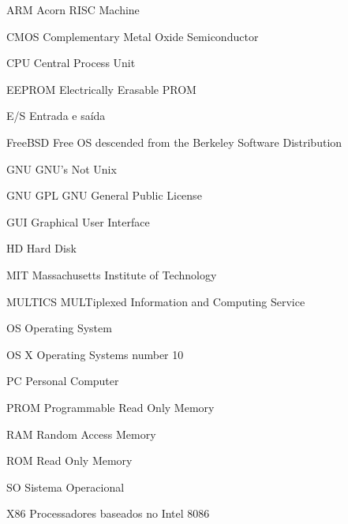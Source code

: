 \begin{siglas}
    \item[ARM] Acorn RISC Machine
    \item[CMOS] Complementary Metal Oxide Semiconductor
    \item[CPU] Central Process Unit
    \item[EEPROM] Electrically Erasable PROM 
    \item[E/S] Entrada e saída
    \item[FreeBSD] Free OS descended from the 
    Berkeley Software Distribution 
    \item[GNU] GNU's Not Unix
    \item[GNU GPL] GNU General Public License
    \item[GUI] Graphical User Interface
    \item[HD] Hard Disk
    \item[MIT] Massachusetts Institute of Technology
    \item[MULTICS] MULTiplexed Information and Computing Service 
    \item[OS] Operating System  
    \item[OS X] Operating Systems number 10 
    \item[PC] Personal Computer
    \item[PROM] Programmable Read Only Memory
    \item[RAM] Random Access Memory
    \item[ROM] Read Only Memory 
    \item[SO] Sistema Operacional
    \item[X86] Processadores baseados no Intel 8086
\end{siglas}